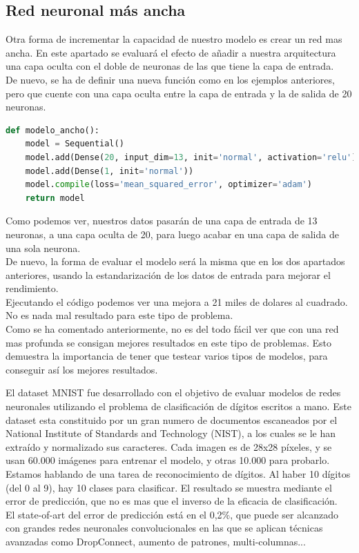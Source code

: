 \subsection{Red neuronal más ancha}
Otra forma de incrementar la capacidad de nuestro modelo es crear un red mas ancha. En este apartado se evaluará el efecto de añadir a nuestra arquitectura una capa oculta con el doble de neuronas de las que tiene la capa de entrada.\\
De nuevo, se ha de definir una nueva función como en los ejemplos anteriores, pero que cuente con una capa oculta entre la capa de entrada y la de salida de 20 neuronas.
\begin{lstlisting}[language=Python]
def modelo_ancho():
	model = Sequential()
	model.add(Dense(20, input_dim=13, init='normal', activation='relu'))
	model.add(Dense(1, init='normal'))
	model.compile(loss='mean_squared_error', optimizer='adam')
	return model
\end{lstlisting}
Como podemos ver, nuestros datos pasarán de una capa de entrada de 13 neuronas, a una capa oculta de 20, para luego acabar en una capa de salida de una sola neurona.\\
De nuevo, la forma de evaluar el modelo será la misma que en los dos apartados anteriores, usando la estandarización de los datos de entrada para mejorar el rendimiento.\\
Ejecutando el código podemos ver una mejora a 21 miles de dolares al cuadrado. No es nada mal resultado para este tipo de problema.\\
Como se ha comentado anteriormente, no es del todo fácil ver que con una red mas profunda se consigan mejores resultados en este tipo de problemas. Esto demuestra la importancia de tener que testear varios tipos de modelos, para conseguir así los mejores resultados.

El dataset MNIST fue desarrollado con el objetivo de evaluar modelos de redes neuronales utilizando el problema de clasificación de dígitos escritos a mano. Este dataset esta constituido por un gran numero de documentos escaneados por el National Institute of Standards and Technology (NIST), a los cuales se le han extraído y normalizado sus caracteres. Cada imagen es de 28x28 píxeles, y se usan 60.000 imágenes para entrenar el modelo, y otras 10.000 para probarlo.\\
Estamos hablando de una tarea de reconocimiento de dígitos. Al haber 10 dígitos (del 0 al 9), hay 10 clases para clasificar. El resultado se muestra mediante el error de predicción, que no es mas que el inverso de la eficacia de clasificación.\\
El state-of-art del error de predicción está en el 0,2\%, que puede ser alcanzado con grandes redes neuronales convolucionales en las que se aplican técnicas avanzadas como DropConnect, aumento de patrones, multi-columnas...\\
